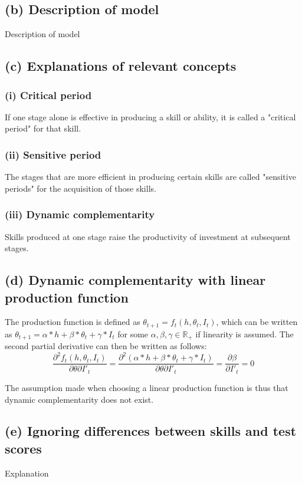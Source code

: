 \documentclass[11pt]{article}
\theoremstyle{definition}
\begin{document}
\subsection*{(b) Description of model}
Description of model 

\subsection*{(c) Explanations of relevant concepts}

    \subsubsection*{(i) Critical period}
    If one stage alone is effective in producing a skill or ability, it is called a "critical period" for that skill. 
    \subsubsection*{(ii) Sensitive period}
    The stages that are more efficient in producing certain skills are called "sensitive periods" for the acquisition of those skills. 
    \subsubsection*{(iii) Dynamic complementarity}
    Skills produced at one stage raise the productivity of investment at subsequent stages.  

   
\subsection*{(d) Dynamic complementarity with linear production function}
The production function is defined as $\theta_{t+1} = f_t(h,\theta_t,I_t)$, which can be written as $\theta_{t+1}=\alpha*h+\beta*\theta_t +\gamma*I_t$ for some $\alpha, \beta, \gamma \in \mathbb{R}_+$ if linearity is assumed. The second partial derivative can then be written as follows: 
\begin{equation}
    \frac{\partial^2 f_t(h,\theta_t,I_t)}{\partial \theta \partial I'_t} = \frac{\partial^2 (\alpha*h+\beta*\theta_t +\gamma*I_t)}{\partial \theta \partial I'_t} = \frac{\partial \beta}{\partial I'_t} = 0    
\end{equation}

\noindent The assumption made when choosing a linear production function is thus that dynamic complementarity does not exist. 

\subsection*{(e) Ignoring differences between skills and test scores}
Explanation
\end{document}

